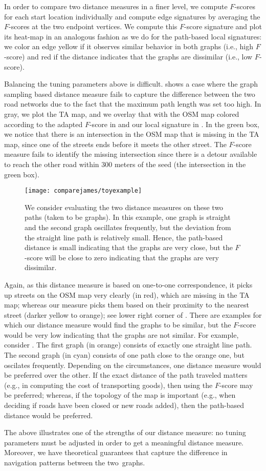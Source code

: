 In order to compare two distance measures in a finer level, we compute
$F$-scores
for each start location individually
and compute edge signatures by averaging the $F$-scores at the two endpoint
vertices.   We compute this $F$-score signature and plot its heat-map in an
analogous fashion as we do for the path-based
local signatures: we color an edge
yellow if it observes similar behavior in both graphs (i.e., high $F$-score) and
red if the distance indicates that the
graphs are dissimilar (i.e., low $F$-score).


Balancing the tuning parameters above is difficult.  shows
a case where the graph sampling based
distance measure fails to capture the difference between the two road networks
due to the fact that the maximum path
length was set too high.  In gray, we plot the TA map, and we overlay
that with the OSM map colored
according to the adapted $F$-score in  and our local
signature in .
In the green box, we notice that there is an intersection in the OSM map that is
missing in the TA map, since one of the
streets ends before it meets the other street.  The $F$-score measure fails to
identify the missing intersection since
there is a detour available to reach the other road within $300$ meters of the
seed (the intersection in the green box).

    \begin{figure}[tbph]
    \centering
    \texttt{[image: comparejames/toyexample]}
    \caption{We consider evaluating the two distance measures on these two
    paths (taken to be graphs).  In this
      example, one graph is straight and the second graph oscillates frequently,
  but
    the deviation from the straight line
      path is relatively small.  Hence, the path-based distance is small
  indicating
    that the graphs are very close, but the
      $F$-score will be close to zero indicating that the graphs are very
    dissimilar.}
    \label{fig-james-toyexample}
    \end{figure}

Again, as this distance measure is based on one-to-one correspondence, it picks
up streets on the OSM map very
clearly (in red), which are missing in the TA map;  whereas our
measure picks them based on their proximity to the nearest street (darker yellow to
orange); see lower right corner of .
There are examples for which our distance measure would find the graphs to be
similar, but the $F$-score would be
very low indicating that the graphs are not similar.  For example, consider
. The first graph (in orange)
consists of exactly one straight line path.
The second graph (in cyan) consists of one path close to the orange one, but
oscilates frequently.  Depending on the circumstances, one distance measure
would be preferred over the other.  If the exact distance of the path traveled
matters (e.g., in computing the cost of transporting goods), then
using the $F$-score may be preferred; whereas, if the topology of the map is
important (e.g., when deciding if roads have been closed or new roads
added), then the path-based distance would be preferred.

The above illustrates one of the strengths of our distance measure: no tuning
parameters must be adjusted in order to
get a meaningful distance measure. Moreover, we have theoretical guarantees that
capture the difference in navigation
patterns between the two~graphs.

